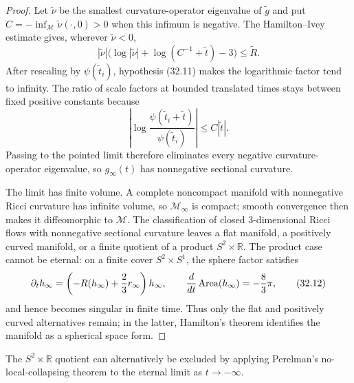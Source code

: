\begin{proof}
\sketch
Let $\widetilde\nu$ be the smallest curvature-operator eigenvalue of
$\widetilde g$ and put
$C=-\inf_{\mathcal M}\widetilde\nu(\cdot,0)>0$ when this infimum is
negative.  The Hamilton--Ivey estimate gives, wherever
$\widetilde\nu<0$,
\[
 |\widetilde\nu|
 \bigl(\log|\widetilde\nu|+\log(C^{-1}+\widetilde t)-3\bigr)
 \le\widetilde R.
\]
After rescaling by $\psi(\widetilde t_i)$, hypothesis (32.11) makes the
logarithmic factor tend to infinity.  The ratio of scale factors at bounded
translated times stays between fixed positive constants because
\[
 \left|\log\frac{\psi(\widetilde t_i+\widetilde t)}
 {\psi(\widetilde t_i)}\right|
 \le C|\widetilde t|.
\]
Passing to the pointed limit therefore eliminates every negative
curvature-operator eigenvalue, so $g_\infty(t)$ has nonnegative sectional
curvature.

The limit has finite volume.  A complete noncompact manifold with
nonnegative Ricci curvature has infinite volume, so $\mathcal M_\infty$ is
compact; smooth convergence then makes it diffeomorphic to $\mathcal M$.
The classification of closed $3$-dimensional Ricci flows with nonnegative
sectional curvature leaves a flat manifold, a positively curved manifold,
or a finite quotient of a product $S^2\times\mathbb R$.  The product case
cannot be eternal: on a finite cover $S^2\times S^1$, the sphere factor
satisfies
\[
 \partial_th_\infty
 =\left(-R(h_\infty)+\frac23r_\infty\right)h_\infty,
 \qquad
 \frac d{dt}\operatorname{Area}(h_\infty)=-\frac83\pi,
 \tag{32.12}
\]
and hence becomes singular in finite time.  Thus only the flat and
positively curved alternatives remain; in the latter, Hamilton's theorem
identifies the manifold as a spherical space form.
\end{proof}

\begin{remark}
\label{rem:chow-iv-exclude-sphere-line-product}


The $S^2\times\mathbb R$ quotient can alternatively be excluded by applying
Perelman's no-local-collapsing theorem to the eternal limit as
$t\to-\infty$.
\end{remark}

